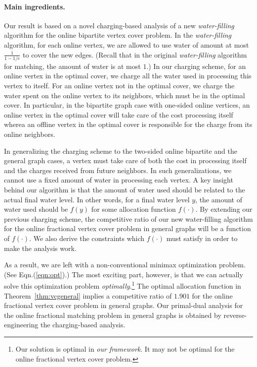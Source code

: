 \documentclass{article}
\begin{document}
\paragraph{Main ingredients.}
Our result is based on a novel charging-based analysis of a new {\em water-filling} algorithm for the online bipartite vertex cover problem. In the {\em water-filling} algorithm, for each online vertex, we are allowed to use water of amount at most $\frac{1}{1-1/e}$ to cover the new edges. (Recall that in the original {\em water-filling} algorithm for matching, the amount of water is at most $1$.) In our charging scheme, for an online vertex in the optimal cover, we charge all the water used in processing this vertex to itself. For an online vertex not in the optimal cover, we charge the water spent on the online vertex to its neighbors, which must be in the optimal cover. In particular, in the bipartite graph case with one-sided online vertices, an online vertex in the optimal cover will take care of the cost processing itself wherea an offline vertex in the optimal cover is responsible for the charge from its online neighbors. 

In generalizing the charging scheme to the two-sided online bipartite and the general graph cases, a vertex must take care of both the cost in processing itself and the charges received from future neighbors. In such generalizations, we cannot use a fixed amount of water in processing each vertex. A key insight behind our algorithm is that the amount of water used should be related to the actual final water level. In other words, for a final water level $y$, the amount of water used should be $f(y)$ for some allocation function $f(\cdot)$. By extending our previous charging scheme, the competitive ratio of our new water-filling algorithm for the online fractional vertex cover problem in general graphs will be a function of $f(\cdot)$. We also derive the constraints which $f(\cdot)$ must satisfy in order to make the analysis work.

As a result, we are left with a non-conventional minimax optimization problem. (See Eqn.(\ref{eqn:opt}).) The most exciting part, however, is that we can actually solve this optimization problem {\em optimally}.\footnote{Our solution is optimal in {\em our framework}. It may not be optimal for the online fractional vertex cover problem. } The optimal allocation function in Theorem~\ref{thm:vcgeneral} implies a competitive ratio of $1.901$ for the online fractional vertex cover problem in general graphs.
Our primal-dual analysis for the online fractional matching problem in general graphs is obtained by reverse-engineering the charging-based analysis.
\end{document}
